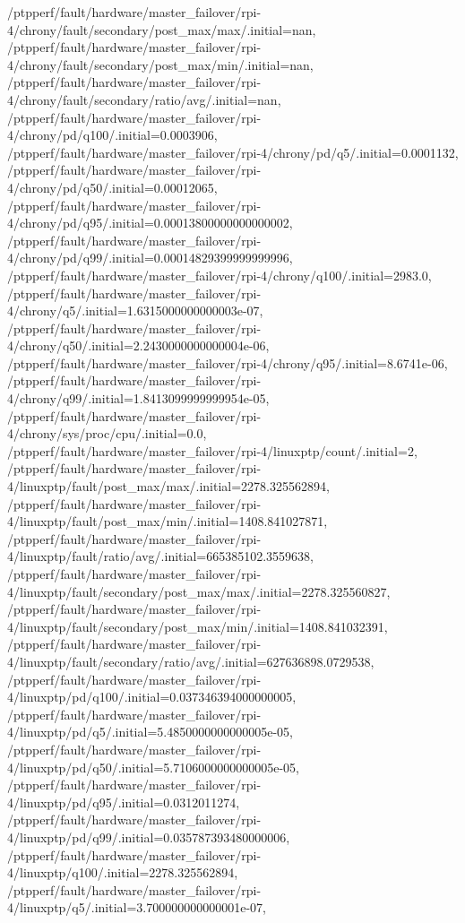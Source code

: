 {    /ptpperf/fault/hardware/master_failover/rpi-4/chrony/fault/secondary/post_max/max/.initial=nan,
    /ptpperf/fault/hardware/master_failover/rpi-4/chrony/fault/secondary/post_max/min/.initial=nan,
    /ptpperf/fault/hardware/master_failover/rpi-4/chrony/fault/secondary/ratio/avg/.initial=nan,
    /ptpperf/fault/hardware/master_failover/rpi-4/chrony/pd/q100/.initial=0.0003906,
    /ptpperf/fault/hardware/master_failover/rpi-4/chrony/pd/q5/.initial=0.0001132,
    /ptpperf/fault/hardware/master_failover/rpi-4/chrony/pd/q50/.initial=0.00012065,
    /ptpperf/fault/hardware/master_failover/rpi-4/chrony/pd/q95/.initial=0.00013800000000000002,
    /ptpperf/fault/hardware/master_failover/rpi-4/chrony/pd/q99/.initial=0.00014829399999999996,
    /ptpperf/fault/hardware/master_failover/rpi-4/chrony/q100/.initial=2983.0,
    /ptpperf/fault/hardware/master_failover/rpi-4/chrony/q5/.initial=1.6315000000000003e-07,
    /ptpperf/fault/hardware/master_failover/rpi-4/chrony/q50/.initial=2.2430000000000004e-06,
    /ptpperf/fault/hardware/master_failover/rpi-4/chrony/q95/.initial=8.6741e-06,
    /ptpperf/fault/hardware/master_failover/rpi-4/chrony/q99/.initial=1.8413099999999954e-05,
    /ptpperf/fault/hardware/master_failover/rpi-4/chrony/sys/proc/cpu/.initial=0.0,
    /ptpperf/fault/hardware/master_failover/rpi-4/linuxptp/count/.initial=2,
    /ptpperf/fault/hardware/master_failover/rpi-4/linuxptp/fault/post_max/max/.initial=2278.325562894,
    /ptpperf/fault/hardware/master_failover/rpi-4/linuxptp/fault/post_max/min/.initial=1408.841027871,
    /ptpperf/fault/hardware/master_failover/rpi-4/linuxptp/fault/ratio/avg/.initial=665385102.3559638,
    /ptpperf/fault/hardware/master_failover/rpi-4/linuxptp/fault/secondary/post_max/max/.initial=2278.325560827,
    /ptpperf/fault/hardware/master_failover/rpi-4/linuxptp/fault/secondary/post_max/min/.initial=1408.841032391,
    /ptpperf/fault/hardware/master_failover/rpi-4/linuxptp/fault/secondary/ratio/avg/.initial=627636898.0729538,
    /ptpperf/fault/hardware/master_failover/rpi-4/linuxptp/pd/q100/.initial=0.037346394000000005,
    /ptpperf/fault/hardware/master_failover/rpi-4/linuxptp/pd/q5/.initial=5.4850000000000005e-05,
    /ptpperf/fault/hardware/master_failover/rpi-4/linuxptp/pd/q50/.initial=5.7106000000000005e-05,
    /ptpperf/fault/hardware/master_failover/rpi-4/linuxptp/pd/q95/.initial=0.0312011274,
    /ptpperf/fault/hardware/master_failover/rpi-4/linuxptp/pd/q99/.initial=0.035787393480000006,
    /ptpperf/fault/hardware/master_failover/rpi-4/linuxptp/q100/.initial=2278.325562894,
    /ptpperf/fault/hardware/master_failover/rpi-4/linuxptp/q5/.initial=3.700000000000001e-07,
}
